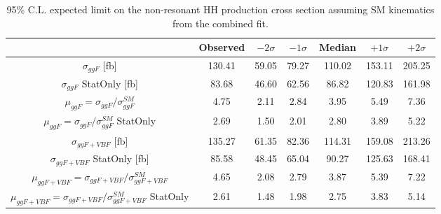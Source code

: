 \begin{table}
\centering
\begin{tabular}{|c|c|c|c|c|c|c|}
\hline
& Observed & $-2\sigma$ & $-1\sigma$ & Median & $+1\sigma$ & $+2\sigma$\\
\hline
$\sigma_{ggF}$ [fb] & 130.41   &    59.05   &    79.27   &    110.02    &    153.11  &    205.25 \\
\hline
$\sigma_{ggF}$ StatOnly [fb] & 83.68   &    46.60  &     62.56  &     86.82   &    120.83  &    161.98 \\ 
\hline
$\mu_{ggF}=\sigma_{ggF}/\sigma_{ggF}^{SM}$ & 4.75   & 2.11   &    2.84  &     3.95  &    5.49  &    7.36 \\ 
\hline
$\mu_{ggF}=\sigma_{ggF}/\sigma_{ggF}^{SM}$ StatOnly & 2.69   & 1.50   &    2.01   &    2.80   &    3.89  &    5.22 \\ 
\hline
\hline
$\sigma_{ggF+VBF}$ [fb] & 135.27   & 61.35  &   82.36  &   114.31   &   159.08  &   213.26 \\ 
\hline
$\sigma_{ggF+VBF}$ StatOnly [fb] & 85.58  &    48.45  &   65.04  &  90.27  &   125.63  &   168.41 \\ 
\hline
$\mu_{ggF+VBF}=\sigma_{ggF+VBF}/\sigma_{ggF+VBF}^{SM}$ & 4.65  &     2.08   &    2.79   &    3.87  &    5.39  &    7.22 \\ 
\hline
$\mu_{ggF+VBF}=\sigma_{ggF+VBF}/\sigma_{ggF+VBF}^{SM}$ StatOnly & 2.61   &    1.48   &    1.98   &    2.75   &    3.83  &    5.14 \\ 
\hline
\end{tabular}
\caption{95\% C.L. expected limit on the non-resonant HH production cross section assuming SM kinematics from the combined fit.}
\label{sec:fit:tab:SMCombinedLimits}
\end{table}

\FloatBarrier

\newpage
